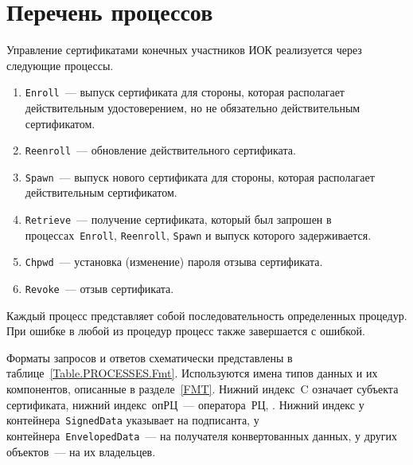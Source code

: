 \section{Перечень процессов}\label{PROCESSES.List}

Управление сертификатами конечных участников ИОК реализуется через 
следующие процессы. 

\begin{enumerate}
\item
\texttt{Enroll}~--- 
выпуск сертификата для стороны, которая располагает действительным
удостоверением, но не обязательно действительным сертификатом.
\item
\texttt{Reenroll}~--- 
обновление действительного сертификата.
\item
\texttt{Spawn}~--- 
выпуск нового сертификата для стороны, которая располагает действительным
сертификатом.
\item
\texttt{Retrieve}~--- 
получение сертификата, который был запрошен в процессах~\texttt{Enroll},
\texttt{Reenroll}, \texttt{Spawn} и выпуск которого задерживается.
\item
\texttt{Chpwd}~--- 
установка (изменение) пароля отзыва сертификата.
\item
\texttt{Revoke}~--- 
отзыв сертификата.
\end{enumerate}

Каждый процесс представляет собой последовательность определенных процедур. 
При ошибке в любой из процедур процесс также завершается с ошибкой.

Форматы запросов и ответов схематически представлены 
в таблице~\ref{Table.PROCESSES.Fmt}. Используются имена типов данных и их 
компонентов, описанные в разделе~\ref{FMT}. Нижний индекс~C означает 
субъекта сертификата, нижний индекс~опРЦ~--- оператора~РЦ,
.
%
Нижний индекс у контейнера~\texttt{SignedData} указывает на подписанта,
у контейнера~\texttt{EnvelopedData}~--- на получателя конвертованных данных,
у других объектов~--- на их владельцев.

